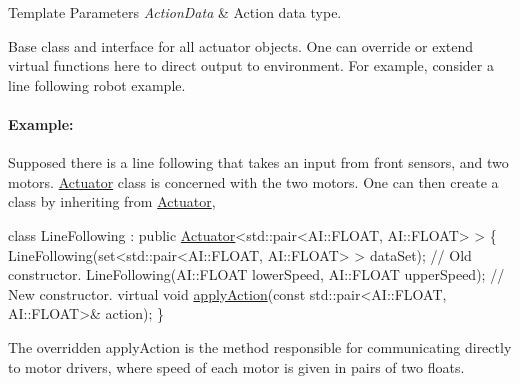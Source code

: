 \begin{DoxyTemplParams}{Template Parameters}
{\em Action\-Data} & Action data type.\\
\hline
\end{DoxyTemplParams}
Base class and interface for all actuator objects. One can override or extend virtual functions here to direct output to environment. For example, consider a line following robot example.

\paragraph*{Example\-:}

Supposed there is a line following that takes an input from front sensors, and two motors. \hyperlink{classAI_1_1Actuator}{Actuator} class is concerned with the two motors. One can then create a class by inheriting from \hyperlink{classAI_1_1Actuator}{Actuator},


\begin{DoxyCode}
\textcolor{keyword}{class }LineFollowing : \textcolor{keyword}{public} \hyperlink{classAI_1_1Actuator_abf654b2c2f911719c86e7c0369349f78}{Actuator}<std::pair<AI::FLOAT, AI::FLOAT> > \{
   LineFollowing(set<std::pair<AI::FLOAT, AI::FLOAT> > dataSet);  \textcolor{comment}{// Old constructor.}
   LineFollowing(AI::FLOAT lowerSpeed, AI::FLOAT upperSpeed);  \textcolor{comment}{// New constructor.}
   \textcolor{keyword}{virtual} \textcolor{keywordtype}{void} \hyperlink{classAI_1_1Actuator_a286216eeeda770be796192fe549e5a58}{applyAction}(\textcolor{keyword}{const} std::pair<AI::FLOAT, AI::FLOAT>& action);
\}
\end{DoxyCode}


The overridden apply\-Action is the method responsible for communicating directly to motor drivers, where speed of each motor is given in pairs of two floats. 

